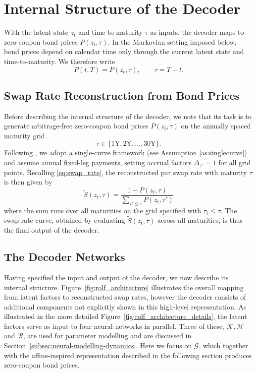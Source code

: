 \section{Internal Structure of the Decoder}


With the latent state $z_t$ and time-to-maturity $\tau$ as inputs, the decoder maps to zero-coupon bond prices $P(z_t,\tau)$. In the Markovian setting imposed below, bond prices depend on calendar time only through the current latent state and time-to-maturity. We therefore write
\[
P(t,T)=P(z_t,\tau), \qquad \tau=T-t.
\]


\subsection{Swap Rate Reconstruction from Bond Prices}

Before describing the internal structure of the decoder, we note that its task is to generate arbitrage-free zero-coupon bond prices $P(z_t,\tau)$ on the annually spaced maturity grid
\[
\tau \in \{1\text{Y},2\text{Y},\dots,30\text{Y}\}.
\]
Following \citet{MatinWanPoulsen2025}, we adopt a single-curve framework (see Assumption \ref{as:singlecurve}) and assume annual fixed-leg payments, setting accrual factors $\Delta_{\tau'}=1$ for all grid points. Recalling \eqref{eq:swap_rate}, the reconstructed par swap rate with maturity $\tau$ is then given by 
\begin{equation}
\tilde{S}(z_t,\tau)
=
\frac{1-P(z_t,\tau)}
{\sum_{\tau' \leq \tau} P(z_t,\tau')}
\label{estimatedswaprates}
\end{equation}
where the sum runs over all maturities on the grid specified with $\tau_i\leq\tau$. The swap rate curve, obtained by evaluating $\tilde{S}(z_t,\tau)$ across all maturities, is thus the final output of the decoder.


\subsection{The Decoder Networks}
Having specified the input and output of the decoder, we now describe its internal structure. Figure~\ref{fig:rolf_architecture} illustrates the overall mapping from latent factors to reconstructed swap rates, however the decoder consists of additional components not explicitly shown in this high-level representation. As illustrated in the more detailed Figure~\ref{fig:rolf_architecture_details}, the latent factors serve as input to four neural networks in parallel. Three of these, $\mathcal{K},\mathcal{H}$ and $\mathcal{R}$, are used for parameter modelling and are discussed in Section~\ref{subsec:neural-modelling-dynamics}. Here we focus on $\mathcal{G}$, which together with the affine-inspired representation described in the following section produces zero-coupon bond prices.

